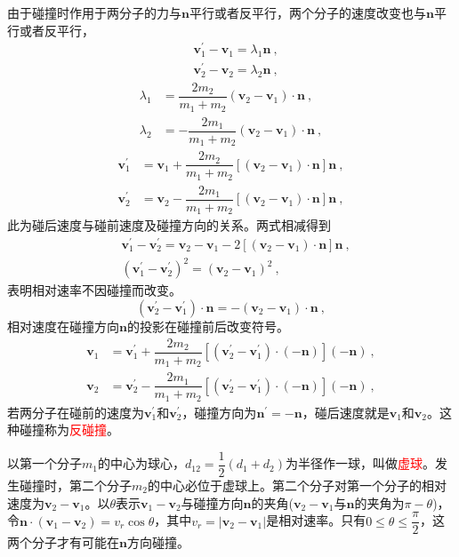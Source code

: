 \documentclass[12pt,a4paper]{article}
\renewcommand{\vec}[1]{\boldsymbol{#1}}
\begin{document}
由于碰撞时作用于两分子的力与$\vec{n}$平行或者反平行，两个分子的速度改变也与$\vec{n}$平行或者反平行，
\begin{align}
& \vec{v}^\prime_1 - \vec{v}_1 = \lambda_1 \vec{n} ~, \\
&\vec{v}^\prime_2 - \vec{v}_2 = \lambda_2 \vec{n} ~,
\end{align}
\begin{align}
\nonumber \lambda_1 &= \dfrac{2m_2}{m_1+m_2} (\vec{v}_2 - \vec{v}_1) \cdot \vec{n} ~, \\
\nonumber \lambda_2 &= -\dfrac{2m_1}{m_1+m_2} (\vec{v}_2 - \vec{v}_1) \cdot \vec{n} ~,
\end{align}
\begin{align}
\vec{v}^\prime_1 &= \vec{v}_1 + \dfrac{2m_2}{m_1+m_2} [(\vec{v}_2 - \vec{v}_1) \cdot \vec{n} ] \vec{n} ~, \\
\vec{v}^\prime_2 &= \vec{v}_2 - \dfrac{2m_1}{m_1+m_2} [(\vec{v}_2 - \vec{v}_1) \cdot \vec{n} ] \vec{n} ~, 
\end{align}
此为碰后速度与碰前速度及碰撞方向的关系。两式相减得到
\begin{align}
&\vec{v}^\prime_1 -\vec{v}^\prime_2 = \vec{v}_2 -\vec{v}_1 -2[(\vec{v}_2 - \vec{v}_1) \cdot \vec{n} ] \vec{n} ~, \\
& (\vec{v}^\prime_1 -\vec{v}^\prime_2)^2 = (\vec{v}_2 -\vec{v}_1)^2 ~,
\end{align}
表明相对速率不因碰撞而改变。
\begin{equation}
(\vec{v}^\prime_2 -\vec{v}^\prime_1)\cdot \vec{n} =  -(\vec{v}_2 - \vec{v}_1) \cdot \vec{n} ~,
\end{equation}
相对速度在碰撞方向$\vec{n}$的投影在碰撞前后改变符号。
\begin{align}
\vec{v}_1 &= \vec{v}^\prime_1 + \dfrac{2m_2}{m_1+m_2} [(\vec{v}^\prime_2 - \vec{v}^\prime_1) \cdot (-\vec{n}) ] (-\vec{n}) ~, \\
\vec{v}_2 &= \vec{v}^\prime_2 - \dfrac{2m_1}{m_1+m_2} [(\vec{v}^\prime_2 - \vec{v}^\prime_1) \cdot (-\vec{n}) ] (-\vec{n}) ~, 
\end{align}
若两分子在碰前的速度为$\vec{v}^\prime_1$和$\vec{v}^\prime_2$，碰撞方向为$\vec{n}^\prime = -\vec{n}$，碰后速度就是$\vec{v}_1$和$\vec{v}_2$。这种碰撞称为\textcolor{red}{反碰撞}。

以第一个分子$m_1$的中心为球心，$d_{12} = \dfrac{1}{2}(d_1+d_2)$为半径作一球，叫做\textcolor{red}{虚球}。发生碰撞时，第二个分子$m_2$的中心必位于虚球上。第二个分子对第一个分子的相对速度为$\vec{v}_2-\vec{v}_1$。以$\theta$表示$\vec{v}_1-\vec{v}_2$与碰撞方向$\vec{n}$的夹角($\vec{v}_2-\vec{v}_1$与$\vec{n}$的夹角为$\pi -\theta$)，令$\vec{n} \cdot (\vec{v}_1-\vec{v}_2) = v_r \cos \theta$，其中$v_r = |\vec{v}_2-\vec{v}_1|$是相对速率。只有$0\leqslant \theta \leqslant \dfrac{\pi}{2}$，这两个分子才有可能在$\vec{n}$方向碰撞。
\end{document}
